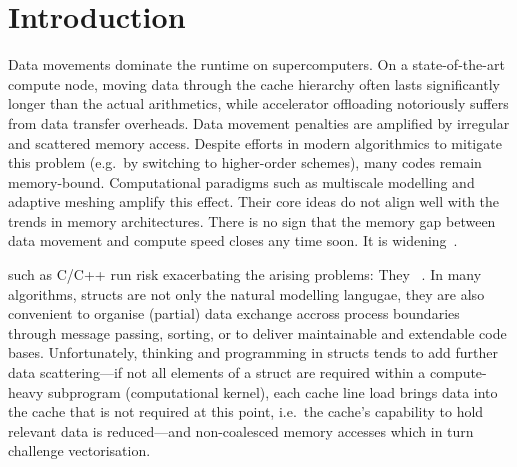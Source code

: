 \section{Introduction}
\label{section:introduction}
 
 
%
%
Data movements dominate the runtime on supercomputers.
On a state-of-the-art compute node, moving data through the cache hierarchy often lasts significantly longer than the actual arithmetics, while accelerator offloading notoriously suffers from data transfer overheads.
Data movement penalties are amplified by irregular and scattered memory access.
Despite efforts in modern algorithmics to mitigate this problem (e.g.~by switching to higher-order schemes), many codes remain memory-bound.
Computational paradigms such as multiscale modelling and adaptive meshing amplify this effect.
Their core ideas do not align well with the trends in memory architectures. 
There is no sign that the memory gap between data movement and compute speed closes any time soon.
It is widening~\cite{Dongarra:2011:ExascaleSoftwareRoadmap}.




%
%
 such as C/C++ run risk exacerbating the arising problems:
They ~\cite{Hirzel:2007:DataLayoutForOO,Homann:2018:SoAx,Reinders:2016:XeonPhi,Jubertie:2018:DataLayoutAbstractionLayers}.
In many algorithms, structs are not only the natural modelling langugae, they are also convenient to organise (partial) data exchange accross process boundaries through message passing, sorting, or to deliver maintainable and extendable code bases.
Unfortunately, thinking and programming in structs tends to add further data scattering---if not all elements of a struct are required within a compute-heavy subprogram (computational kernel), each cache line load brings data into the cache that is not required at this point, i.e.~the cache's capability to hold relevant data is reduced---and non-coalesced memory accesses which in turn challenge vectorisation. 


